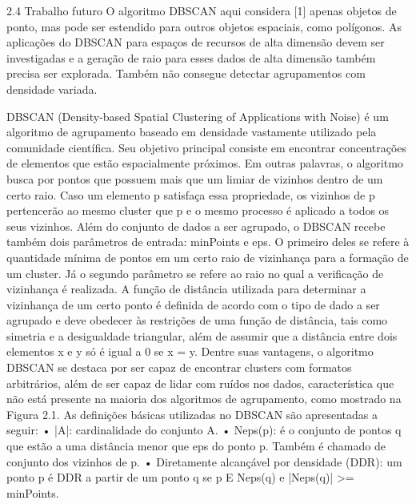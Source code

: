2.4 Trabalho futuro
O algoritmo DBSCAN aqui considera [1] apenas objetos de ponto, mas pode ser estendido para outros objetos espaciais, como polígonos. As aplicações do DBSCAN para espaços de recursos de alta dimensão devem ser investigadas e a geração de raio para esses dados de alta dimensão também precisa ser explorada. Também não consegue detectar agrupamentos com densidade variada.

DBSCAN (Density-based Spatial Clustering of Applications with Noise) é um algoritmo
de agrupamento baseado em densidade vastamente utilizado pela comunidade científica.
Seu objetivo principal consiste em encontrar concentrações de elementos que estão espacialmente
próximos. Em outras palavras, o algoritmo busca por pontos que possuem mais que um
limiar de vizinhos dentro de um certo raio. Caso um elemento p satisfaça essa propriedade, os
vizinhos de p pertencerão ao mesmo cluster que p e o mesmo processo é aplicado a todos os
seus vizinhos. Além do conjunto de dados a ser agrupado, o DBSCAN recebe também dois
parâmetros de entrada: minPoints e eps. O primeiro deles se refere à quantidade mínima de
pontos em um certo raio de vizinhança para a formação de um cluster. Já o segundo parâmetro
se refere ao raio no qual a verificação de vizinhança é realizada. A função de distância utilizada
para determinar a vizinhança de um certo ponto é definida de acordo com o tipo de dado
a ser agrupado e deve obedecer às restrições de uma função de distância, tais como simetria
e a desigualdade triangular, além de assumir que a distância entre dois elementos x e y só é
igual a 0 se x = y. Dentre suas vantagens, o algoritmo DBSCAN se destaca por ser capaz de
encontrar clusters com formatos arbitrários, além de ser capaz de lidar com ruídos nos dados,
característica que não está presente na maioria dos algoritmos de agrupamento, como mostrado
na Figura 2.1.
As definições básicas utilizadas no DBSCAN são apresentadas a seguir:
• |A|: cardinalidade do conjunto A.
• Neps(p): é o conjunto de pontos q que estão a uma distância menor que eps do ponto p.
Também é chamado de conjunto dos vizinhos de p.
• Diretamente alcançável por densidade (DDR): um ponto p é DDR a partir de um ponto q
se p E Neps(q) e |Neps(q)| >= minPoints.

